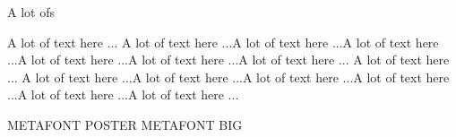 \documentclass[a4paper]{report}
\begin{document}

\begin{multicols}{1}

A lot ofs

\vfill
\columnbreak

A lot of text here ... A lot of text here ...A lot of text here ...A lot of text here ...A lot of text here ...A lot of text here ...A lot of text here ...
A lot of text here ... A lot of text here ...A lot of text here ...A lot of text here ...A lot of text here ...A lot of text here ...A lot of text here ...


\end{multicols}

		
		\noindent
		\vspace{.5cm}
\hrulefill
\vspace{2cm}


\noindent 
 \begin{center}
METAFONT POSTER
\tinyfont
METAFONT BIG
\end{center}
\end{document}
